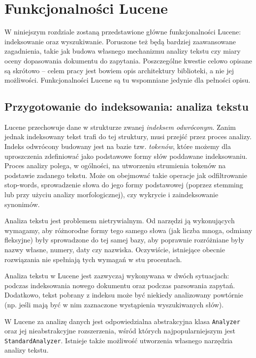 \chapter{Funkcjonalności Lucene}

W niniejszym rozdziale zostaną przedstawione główne funkcjonalności Lucene: indeksowanie oraz wyszukiwanie. Poruszone też będą bardziej zaawansowane zagadnienia, takie jak budowa własnego mechanizmu analizy tekstu czy miary oceny dopasowania dokumentu do zapytania. Poszczególne kwestie celowo opisane są skrótowo -- celem pracy jest bowiem opis architektury biblioteki, a nie jej możliwości. Funkcjonalności Lucene są tu wspomniane jedynie dla pełności opisu.

\section{Przygotowanie do indeksowania: analiza tekstu}

Lucene przechowuje dane w strukturze zwanej \emph{indeksem odwróconym}. Zanim jednak indeksowany tekst trafi do tej struktury, musi przejść przez proces analizy. Indeks odwrócony budowany jest na bazie tzw. \emph{tokenów}, które możemy dla uproszczenia zdefiniować jako podstawowe formy słów poddawane indeksowaniu. Proces analizy polega, w ogólności, na utworzeniu strumienia tokenów na podstawie zadanego tekstu. Może on obejmować takie operacje jak odfiltrowanie stop-words, sprowadzenie słowa do jego formy podstawowej (poprzez stemming lub przy użyciu analizy morfologicznej), czy wykrycie i zaindeksowanie synonimów. 

Analiza tekstu jest problemem nietrywialnym. Od narzędzi ją wykonujących wymagamy, aby różnorodne formy tego samego słowa (jak liczba mnoga, odmiany fleksyjne) były sprowadzone do tej samej bazy, aby poprawnie rozróżniane były nazwy własne, numery, daty czy nazwiska. Oczywiście, istniejące obecnie rozwiązania nie spełniają tych wymagań w stu procentach.

Analiza tekstu w Lucene jest zazwyczaj wykonywana w dwóch sytuacjach: podczas indeksowania nowego dokumentu oraz podczas parsowania zapytań. Dodatkowo, tekst pobrany z indeksu może być niekiedy analizowany powtórnie (np. jeśli mają być w nim zaznaczone wystąpienia wyszukiwanych słów).

W Lucene za analizę danych jest odpowiedzialna abstrakcyjna klasa \texttt{Analyzer} oraz jej nieabstrakcyjne rozszerzenia, wśród których najpopularniejszym jest \texttt{StandardAnalyzer}. Istnieje także możliwość utworzenia własnego narzędzia analizy tekstu. 

